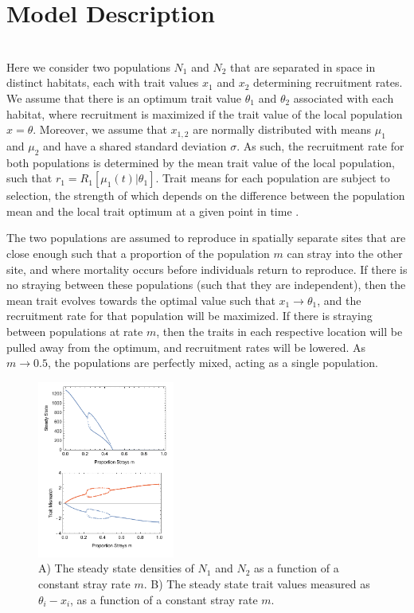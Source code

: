 \documentclass[twocolumn,preprintnumbers,amsmath,amssymb,superscriptaddress]{revtex4}
\begin{document}




\section{Model Description}

\\
\noindent Here we consider two populations $N_1$ and $N_2$ that are separated in space in distinct habitats, each with trait values $x_1$ and $x_2$ determining recruitment rates.
We assume that there is an optimum trait value $\theta_1$ and $\theta_2$ associated with each habitat, where recruitment is maximized if the trait value of the local population $x = \theta$.
Moreover, we assume that $x_{1,2}$ are normally distributed with means $\mu_1$ and $\mu_2$ and have a shared standard deviation $\sigma$.
As such, the recruitment rate for both populations is determined by the mean trait value of the local population, such that $r_1 = R_1[\mu_1(t)|\theta_1]$.
Trait means for each population are subject to selection, the strength of which depends on the difference between the population mean and the local trait optimum at a given point in time \cite{simpson1953major,Lande:1976ga}.

The two populations are assumed to reproduce in spatially separate sites that are close enough such that a proportion of the population $m$ can stray into the other site, and where mortality occurs before individuals return to reproduce.
If there is no straying between these populations (such that they are independent), then the mean trait evolves towards the optimal value such that $x_1 \rightarrow \theta_1$, and the recruitment rate for that population will be maximized.
If there is straying between populations at rate $m$, then the traits in each respective location will be pulled away from the optimum, and recruitment rates will be lowered.
As $m \rightarrow 0.5$, the populations are perfectly mixed, acting as a single population.

\begin{figure}
  \captionsetup{justification=raggedright,
singlelinecheck=false
}
\centering
\includegraphics[width=0.4\textwidth]{figs2/fig_Density.pdf}
\caption{
A) The steady state densities of $N_1$ and $N_2$ as a function of a constant stray rate $m$.
B) The steady state trait values measured as $\theta_i - x_i$, as a function of a constant stray rate $m$. 
} \label{fig:traj}
\end{figure}
\end{document}
